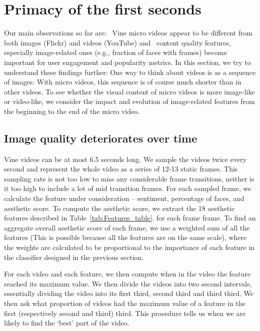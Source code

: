 \section{Primacy of the first seconds}

Our main observations so far are: \one\ Vine micro videos appear to be different from both images (Flickr) and videos (YouTube) and \two\  content quality features, especially image-related ones (e.g., fraction of faces with frames) become  important for user engagement and popularity metrics. %
In this section, we try to understand these findings further: One way to think about videos is as a sequence of images. With micro videos, this sequence is of course much shorter than in other videos. To see whether the visual content of micro videos is more image-like or video-like, we consider the impact and evolution of image-related features from the beginning to the end of the micro video. 

\subsection{Image quality deteriorates over time}




Vine videos can be at most 6.5 seconds long. We sample the videos twice every second and represent the whole video as a series of 12-13 static frames. This sampling rate is not too low to miss any considerable frame transitions, neither is it too high to include a lot of mid transition frames. For each sampled frame, we calculate the feature under consideration -- sentiment, percentage of faces, and aesthetic score. To compute the aesthetic score, we extract the 18 aesthetic features described in Table~\ref{tab:Features_table}. for each frame frame. To find an aggregate overall aesthetic score of each frame, we use a weighted sum of all the features (This is possible because all the features are on the same scale), where the weights are calculated to be proportional to the importance of each feature in the classifier designed in the previous section. 


For each video and each feature, we then compute when in the video the feature reached its maximum value. We then divide the videos into two second intervals, essentially dividing the video into its first third, second third and third third. We then ask what proportion of videos had the maximum value of a feature in the first (respectively second and third) third. This procedure tells us when we are likely to find the `best' part of the video. 

